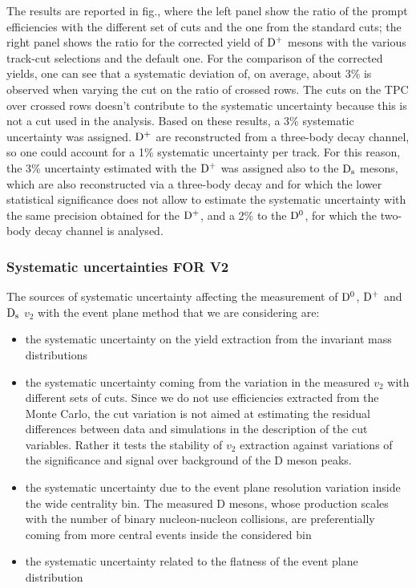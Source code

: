 The results are reported in fig., where the
left panel show the ratio of the prompt efficiencies with the different set of cuts 
and the one from the standard cuts; the right panel shows the ratio for the corrected yield of
 ${\rm D^+}$ mesons with the various track-cut selections and the default one.
For the comparison of the corrected yields, one can see that a systematic 
deviation of, on average, about 3\% is observed when varying the cut on the ratio of 
crossed rows. The cuts on the TPC over crossed rows doesn't contribute to the systematic uncertainty
because this is not a cut used in the analysis.
Based on these results, a 3\% systematic uncertainty was assigned.
${\rm D^+}$ are reconstructed from a three-body decay
channel, so one could account for a 1\% systematic uncertainty per track.
For this reason, the 3\% uncertainty estimated with the ${\rm D^+}$ was
assigned also to the ${\rm D_s}$ mesons, which are also reconstructed via a 
three-body decay and for which the lower statistical significance 
does not allow to estimate the systematic uncertainty with the same
precision obtained for the ${\rm D^+}$, and a 2\% to the ${\rm D^0}$, for which the two-body decay channel
is analysed.

\subsubsection{Systematic uncertainties FOR V2}
\label{systsection}

The sources of systematic uncertainty affecting the measurement of ${\rm D^0}$, ${\rm D^+}$ and ${\rm D_s}$ $v_2$ with the event plane method that we are considering are:
\begin{itemize}
\item{the systematic uncertainty on the yield extraction from the invariant mass distributions}
\item{the systematic uncertainty coming from the variation in the measured $v_2$ with different sets of cuts. Since we do not use efficiencies extracted 
from the Monte Carlo, the cut variation is not aimed at estimating the residual
differences between data and simulations in the description of the cut 
variables. Rather it tests the stability of $v_2$ extraction against variations
of the significance and signal over background of the D meson peaks.}
\item{the systematic uncertainty due to the event plane resolution variation 
inside the wide centrality bin. The measured D mesons, whose production 
scales with the number of binary nucleon-nucleon collisions, are preferentially
coming from more central events inside the considered bin}
\item{the systematic uncertainty related to the flatness of the event plane distribution}
\end{itemize}

